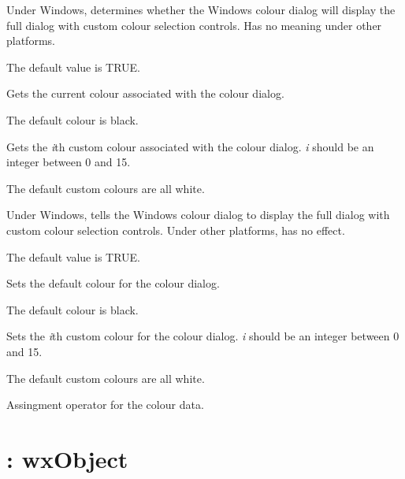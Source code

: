 
Under Windows, determines whether the Windows colour dialog will display the full dialog
with custom colour selection controls. Has no meaning under other platforms.

The default value is TRUE.



Gets the current colour associated with the colour dialog.

The default colour is black.



Gets the {\it i}th custom colour associated with the colour dialog. {\it i} should
be an integer between 0 and 15.

The default custom colours are all white.



Under Windows, tells the Windows colour dialog to display the full dialog
with custom colour selection controls. Under other platforms, has no effect.

The default value is TRUE.



Sets the default colour for the colour dialog.

The default colour is black.



Sets the {\it i}th custom colour for the colour dialog. {\it i} should
be an integer between 0 and 15.

The default custom colours are all white.



Assingment operator for the colour data.


\section{: wxObject}\label{wxcolourdatabase}

